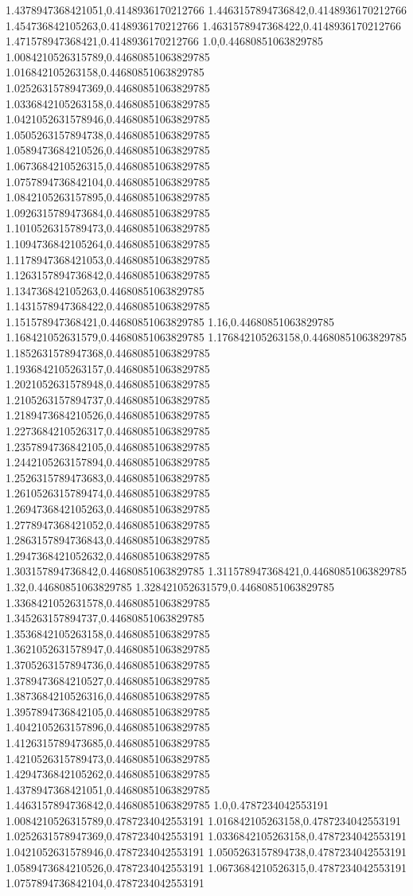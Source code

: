 1.4378947368421051,0.4148936170212766
1.4463157894736842,0.4148936170212766
1.454736842105263,0.4148936170212766
1.4631578947368422,0.4148936170212766
1.471578947368421,0.4148936170212766
1.0,0.44680851063829785
1.0084210526315789,0.44680851063829785
1.016842105263158,0.44680851063829785
1.0252631578947369,0.44680851063829785
1.0336842105263158,0.44680851063829785
1.0421052631578946,0.44680851063829785
1.0505263157894738,0.44680851063829785
1.0589473684210526,0.44680851063829785
1.0673684210526315,0.44680851063829785
1.0757894736842104,0.44680851063829785
1.0842105263157895,0.44680851063829785
1.0926315789473684,0.44680851063829785
1.1010526315789473,0.44680851063829785
1.1094736842105264,0.44680851063829785
1.1178947368421053,0.44680851063829785
1.1263157894736842,0.44680851063829785
1.134736842105263,0.44680851063829785
1.1431578947368422,0.44680851063829785
1.151578947368421,0.44680851063829785
1.16,0.44680851063829785
1.168421052631579,0.44680851063829785
1.176842105263158,0.44680851063829785
1.1852631578947368,0.44680851063829785
1.1936842105263157,0.44680851063829785
1.2021052631578948,0.44680851063829785
1.2105263157894737,0.44680851063829785
1.2189473684210526,0.44680851063829785
1.2273684210526317,0.44680851063829785
1.2357894736842105,0.44680851063829785
1.2442105263157894,0.44680851063829785
1.2526315789473683,0.44680851063829785
1.2610526315789474,0.44680851063829785
1.2694736842105263,0.44680851063829785
1.2778947368421052,0.44680851063829785
1.2863157894736843,0.44680851063829785
1.2947368421052632,0.44680851063829785
1.303157894736842,0.44680851063829785
1.311578947368421,0.44680851063829785
1.32,0.44680851063829785
1.328421052631579,0.44680851063829785
1.3368421052631578,0.44680851063829785
1.345263157894737,0.44680851063829785
1.3536842105263158,0.44680851063829785
1.3621052631578947,0.44680851063829785
1.3705263157894736,0.44680851063829785
1.3789473684210527,0.44680851063829785
1.3873684210526316,0.44680851063829785
1.3957894736842105,0.44680851063829785
1.4042105263157896,0.44680851063829785
1.4126315789473685,0.44680851063829785
1.4210526315789473,0.44680851063829785
1.4294736842105262,0.44680851063829785
1.4378947368421051,0.44680851063829785
1.4463157894736842,0.44680851063829785
1.0,0.4787234042553191
1.0084210526315789,0.4787234042553191
1.016842105263158,0.4787234042553191
1.0252631578947369,0.4787234042553191
1.0336842105263158,0.4787234042553191
1.0421052631578946,0.4787234042553191
1.0505263157894738,0.4787234042553191
1.0589473684210526,0.4787234042553191
1.0673684210526315,0.4787234042553191
1.0757894736842104,0.4787234042553191
